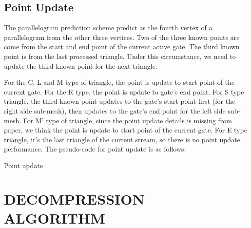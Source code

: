 \documentclass[onecolumn, 12pt]{article}
\begin{document}
{\subsection{Point Update} \label{sec:vetexUpdate}
The parallelogram prediction scheme predict as the fourth vertex of a parallelogram from the other three vertices. Two of the three known points are come from the start and end point of the current active gate. The third known point is from the last processed triangle. Under this circumstance, we need to update the third known point for the next triangle.

For the C, L and M type of triangle, the point is update to start point of the current gate. For the R type, the point is update to gate's end point. For S type triangle, the third known point updates to the gate's start point first (for the right side sub-mesh), then updates to the gate's end point for the left side sub-mesh. For M' type of triangle, since the point update details is missing from paper, we think the point is update to start point of the current gate. For E type triangle, it's the last triangle of the current stream, so there is no point update performance. The pseudo-code for point update is as follows:


\begin{algorithm}[H]
\caption{Point update}
\begin{algorithmic}[1]
\ENDIF
\end{algorithmic}
\end{algorithm}



\section{DECOMPRESSION ALGORITHM}
}
\end{document}
